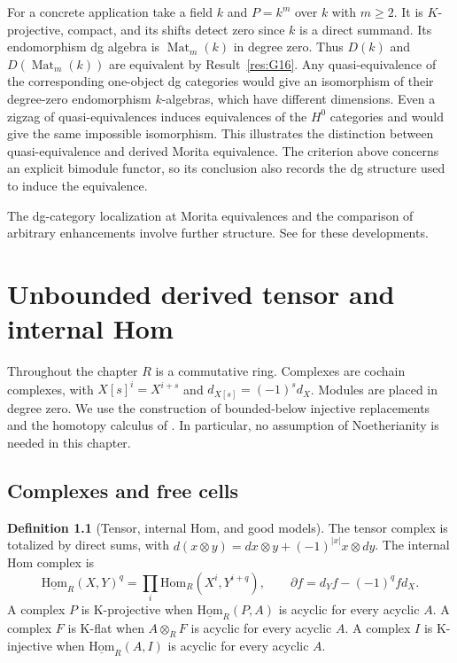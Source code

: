 \documentclass[11pt,oneside,openany]{book}
\theoremstyle{definition}
\newtheorem{definition}[theorem]{Definition}
\theoremstyle{remark}
\begin{document}
For a concrete application take a field \(k\) and \(P=k^m\)
over \(k\) with \(m\geq2\). It is \(K\)-projective, compact,
and its shifts detect zero since \(k\) is a direct summand.
Its endomorphism dg algebra is \(\operatorname{Mat}_m(k)\)
in degree zero. Thus \(D(k)\) and \(D(\operatorname{Mat}_m(k))\)
are equivalent by Result~\ref{res:G16}. Any quasi-equivalence
of the corresponding one-object dg categories would give an
isomorphism of their degree-zero endomorphism \(k\)-algebras,
which have different dimensions. Even a zigzag of
quasi-equivalences induces equivalences of the \(H^0\) categories
and would give the same impossible isomorphism. This illustrates
the distinction between quasi-equivalence and derived Morita
equivalence. The criterion above concerns an explicit bimodule
functor, so its conclusion also records the dg structure used
to induce the equivalence.

The dg-category localization at Morita equivalences and the
comparison of arbitrary enhancements involve further structure.
See \cite[\S\S3.8, 4.5]{keller} for these developments.
\chapter{Unbounded derived tensor and internal Hom}
\label{ch:unbounded}

Throughout the chapter \(R\) is a commutative ring. Complexes are
cochain complexes, with \(X[s]^i=X^{i+s}\) and
\(d_{X[s]}=(-1)^s d_X\). Modules are placed in degree zero. We use the
construction of bounded-below injective replacements and the homotopy
calculus of \cite[R01, R03, R04]{ha-core}. In particular, no assumption
of Noetherianity is needed in this chapter.

\section{Complexes and free cells}

\begin{definition}[Tensor, internal Hom, and good models]\label{res:U01}
The tensor complex is totalized by direct sums, with
\(d(x\otimes y)=d x\otimes y+(-1)^{|x|}x\otimes d y\).
The internal Hom complex is
\[
 \underline{\mathrm{Hom}}_R(X,Y)^q
   =\prod_i\mathrm{Hom}_R(X^i,Y^{i+q}),\qquad
 \partial f=d_Y f-(-1)^q f d_X .
\]
A complex \(P\) is K-projective when
\(\underline{\mathrm{Hom}}_R(P,A)\) is acyclic for every acyclic \(A\).
A complex \(F\) is K-flat when \(A\otimes_R F\) is acyclic for every
acyclic \(A\). A complex \(I\) is K-injective when
\(\underline{\mathrm{Hom}}_R(A,I)\) is acyclic for every acyclic \(A\).
\end{definition}
\end{document}
